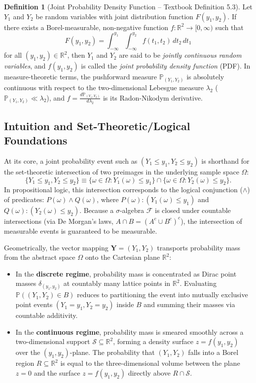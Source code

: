 \documentclass[11pt, letterpaper]{article}
\theoremstyle{definition}
\newtheorem{definition}{Definition}[section]
\theoremstyle{remark}
\begin{document}
\begin{definition}[Joint Probability Density Function -- Textbook Definition 5.3]
Let $Y_1$ and $Y_2$ be random variables with joint distribution function $F(y_1, y_2)$. If there exists a Borel-measurable, non-negative function $f : \mathbb{R}^2 \to [0, \infty)$ such that
\[
    F(y_1, y_2) = \int_{-\infty}^{y_1} \int_{-\infty}^{y_2} f(t_1, t_2) \, dt_2 \, dt_1
\]
for all $(y_1, y_2) \in \mathbb{R}^2$, then $Y_1$ and $Y_2$ are said to be \emph{jointly continuous random variables}, and $f(y_1, y_2)$ is called the \emph{joint probability density function} (PDF). In measure-theoretic terms, the pushforward measure $\mathbb{P}_{(Y_1, Y_2)}$ is absolutely continuous with respect to the two-dimensional Lebesgue measure $\lambda_2$ ($\mathbb{P}_{(Y_1, Y_2)} \ll \lambda_2$), and $f = \frac{d\mathbb{P}_{(Y_1, Y_2)}}{d\lambda_2}$ is its Radon-Nikodym derivative.
\end{definition}

\subsection{Intuition and Set-Theoretic/Logical Foundations}

At its core, a joint probability event such as $(Y_1 \le y_1, Y_2 \le y_2)$ is shorthand for the set-theoretic intersection of two preimages in the underlying sample space $\Omega$:
\[
    \{Y_1 \le y_1, Y_2 \le y_2\} \equiv \{\omega \in \Omega : Y_1(\omega) \le y_1\} \cap \{\omega \in \Omega : Y_2(\omega) \le y_2\}.
\]
In propositional logic, this intersection corresponds to the logical conjunction ($\land$) of predicates: $P(\omega) \land Q(\omega)$, where $P(\omega) : (Y_1(\omega) \le y_1)$ and $Q(\omega) : (Y_2(\omega) \le y_2)$. Because a $\sigma$-algebra $\mathcal{F}$ is closed under countable intersections (via De Morgan's laws, $A \cap B = (A^c \cup B^c)^c$), the intersection of measurable events is guaranteed to be measurable.

Geometrically, the vector mapping $\mathbf{Y} = (Y_1, Y_2)$ transports probability mass from the abstract space $\Omega$ onto the Cartesian plane $\mathbb{R}^2$:
\begin{itemize}
    \item In the \textbf{discrete regime}, probability mass is concentrated as Dirac point masses $\delta_{(y_1, y_2)}$ at countably many lattice points in $\mathbb{R}^2$. Evaluating $\mathbb{P}((Y_1, Y_2) \in B)$ reduces to partitioning the event into mutually exclusive point events $(Y_1 = y_1, Y_2 = y_2)$ inside $B$ and summing their masses via countable additivity.
    \item In the \textbf{continuous regime}, probability mass is smeared smoothly across a two-dimensional support $\mathcal{S} \subseteq \mathbb{R}^2$, forming a density surface $z = f(y_1, y_2)$ over the $(y_1, y_2)$-plane. The probability that $(Y_1, Y_2)$ falls into a Borel region $R \subseteq \mathbb{R}^2$ is equal to the three-dimensional volume between the plane $z = 0$ and the surface $z = f(y_1, y_2)$ directly above $R \cap \mathcal{S}$.
\end{itemize}
\end{document}
